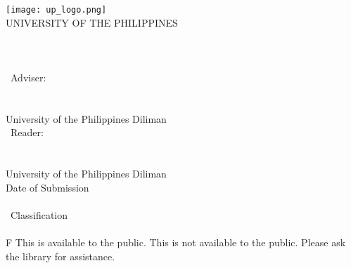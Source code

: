 \begin{titlepage}
\center
\vspace*{0.55cm}

\texttt{[image: up\_logo.png]}\\[0.6cm]

UNIVERSITY OF THE PHILIPPINES\\[1cm]

\Degree\\[1.2cm]

\textbf{\Student}\\
\bigskip
\Title\\[1.2cm]

\Type\ Adviser:\\
\bigskip
\textbf{\Adviser}\\
\Department\\
University of the Philippines Diliman\\[1.2cm]

\Type\ Reader:\\
\bigskip
\textbf{\Reader}\\
\Department\\
University of the Philippines Diliman\\[1.2cm]

Date of Submission\\
\medskip
\SubmissionDate\\[1.2cm]

\Type\ Classification\\
\medskip
\textbf{\Classification}\\
\medskip
\if \Classification F
This \MakeLowercase{\Type} is available to the public.
\else
This \MakeLowercase{\Type} is not available to the public. Please ask the library for assistance.
\fi

\end{titlepage}
